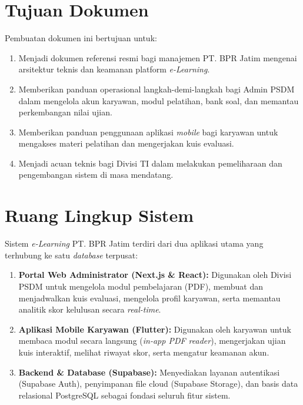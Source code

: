 \section{Tujuan Dokumen}
Pembuatan dokumen ini bertujuan untuk:
\begin{enumerate}
    \item Menjadi dokumen referensi resmi bagi manajemen PT. BPR Jatim mengenai arsitektur teknis dan keamanan platform \textit{e-Learning}.
    \item Memberikan panduan operasional langkah-demi-langkah bagi Admin PSDM dalam mengelola akun karyawan, modul pelatihan, bank soal, dan memantau perkembangan nilai ujian.
    \item Memberikan panduan penggunaan aplikasi \textit{mobile} bagi karyawan untuk mengakses materi pelatihan dan mengerjakan kuis evaluasi.
    \item Menjadi acuan teknis bagi Divisi TI dalam melakukan pemeliharaan dan pengembangan sistem di masa mendatang.
\end{enumerate}

\section{Ruang Lingkup Sistem}
Sistem \textit{e-Learning} PT. BPR Jatim terdiri dari dua aplikasi utama yang terhubung ke satu \textit{database} terpusat:
\begin{enumerate}
    \item \textbf{Portal Web Administrator (Next.js \& React):} Digunakan oleh Divisi PSDM untuk mengelola modul pembelajaran (PDF), membuat dan menjadwalkan kuis evaluasi, mengelola profil karyawan, serta memantau analitik skor kelulusan secara \textit{real-time}.
    \item \textbf{Aplikasi Mobile Karyawan (Flutter):} Digunakan oleh karyawan untuk membaca modul secara langsung (\textit{in-app PDF reader}), mengerjakan ujian kuis interaktif, melihat riwayat skor, serta mengatur keamanan akun.
    \item \textbf{Backend \& Database (Supabase):} Menyediakan layanan autentikasi (Supabase Auth), penyimpanan file cloud (Supabase Storage), dan basis data relasional PostgreSQL sebagai fondasi seluruh fitur sistem.
\end{enumerate}

